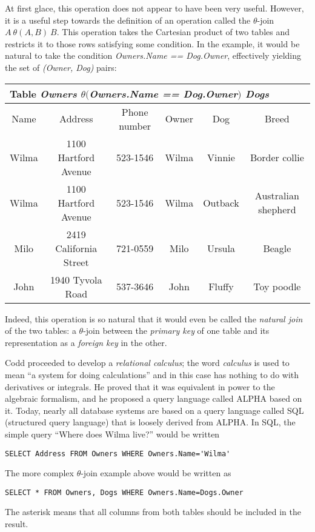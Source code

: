 \documentclass[12pt]{article}
\begin{document}
At first glace, this operation does not appear to have been very useful.
However, it is a useful step towards the definition of an operation called
the $\theta$-join $A~\theta(A,B)~B$.  This operation takes the Cartesian 
product of two tables and restricts it to those rows satisfying some condition.
In the example, it would be natural to take the 
condition {\em Owners.Name == Dog.Owner}, effectively yielding the set of
{\em (Owner, Dog)} pairs:

\vspace{5mm} 
\begin{tabular}{|c|c|c|c|c|c|}
\multicolumn{6}{l}{Table {\em Owners $\theta($Owners.Name == Dog.Owner$)$ Dogs}} \\
\hline
Name & Address & Phone number & Owner & Dog & Breed \\
\hline
Wilma & 1100 Hartford Avenue & 523-1546 & Wilma & Vinnie & Border collie \\
Wilma & 1100 Hartford Avenue & 523-1546 & Wilma & Outback & Australian shepherd \\
Milo & 2419 California Street  & 721-0559 & Milo & Ursula & Beagle \\
John & 1940 Tyvola Road & 537-3646 & John & Fluffy & Toy poodle \\
\hline
\end{tabular}
\vspace{5mm} 

Indeed, this operation is so natural that it would even be called the 
{\em natural join} of the two tables: a $\theta$-join between the 
{\em primary key} of one table and its representation as a {\em foreign key}
in the other. 

Codd proceeded to develop a {\em relational calculus}; the word {\em calculus} 
is used to mean ``a system for doing calculations'' and in this case has
nothing to do with derivatives or integrals.  He proved that it was equivalent
in power to the algebraic formalism, and he proposed a query language 
called ALPHA based on it.  Today, nearly all database systems are based on a
query language called SQL (structured query language) that is loosely derived
from ALPHA.  In SQL, the simple query ``Where does Wilma live?'' would be
written 
\begin{small}
\begin{verbatim}
SELECT Address FROM Owners WHERE Owners.Name='Wilma'
\end{verbatim}
\end{small}
The more complex $\theta$-join example above would be written as
\begin{small}
\begin{verbatim}
SELECT * FROM Owners, Dogs WHERE Owners.Name=Dogs.Owner
\end{verbatim}
\end{small}
The asterisk means that all columns from both tables should be included
in the result.
\end{document}
